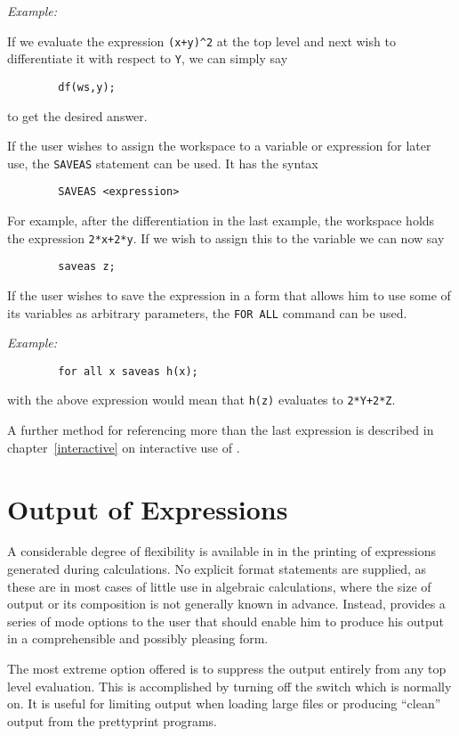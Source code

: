 \textit{Example:}

If we evaluate the expression \texttt{(x+y)\textasciicircum2} at the top
level and next
wish to differentiate it with respect to \texttt{Y}, we can simply say
\begin{verbatim}
        df(ws,y);
\end{verbatim}
to get the desired answer.

\hypertarget{command:SAVEAS}{}
If the user wishes to assign the workspace to a variable or expression for
later use, the \texttt{SAVEAS} statement can be used.  It
has the syntax
\begin{verbatim}
        SAVEAS <expression>
\end{verbatim}
For example, after the differentiation in the last example, the workspace
holds the expression \texttt{2*x+2*y}.  If we wish to assign this to the
variable  we can now say
\begin{verbatim}
        saveas z;
\end{verbatim}
If the user wishes to save the expression in a form that allows him to use
some of its variables as arbitrary parameters, the \texttt{FOR ALL}
command can be used.

\textit{Example:}
\begin{verbatim}
        for all x saveas h(x);
\end{verbatim}

with the above expression would mean that \texttt{h(z)} evaluates to 
\texttt{2*Y+2*Z}.

A further method for referencing more than the last expression is described
in chapter~\ref{interactive} on interactive use of {\REDUCE}.


\section{Output of Expressions}

A considerable degree of flexibility is available in {\REDUCE} in the
printing of expressions generated during calculations.  No explicit format
statements are supplied, as these are in most cases of little use in
algebraic calculations, where the size of output or its composition is not
generally known in advance.  Instead, {\REDUCE} provides a series of mode
options to the user that should enable him to produce his output in a
comprehensible and possibly pleasing form.

\hypertarget{switch:OUTPUT}{}
The most extreme option offered is to suppress the output entirely from
any top level evaluation.  This is accomplished by turning off the switch
 which is normally on.  It is useful for
limiting output when loading large files or producing ``clean'' output from
the prettyprint programs.

